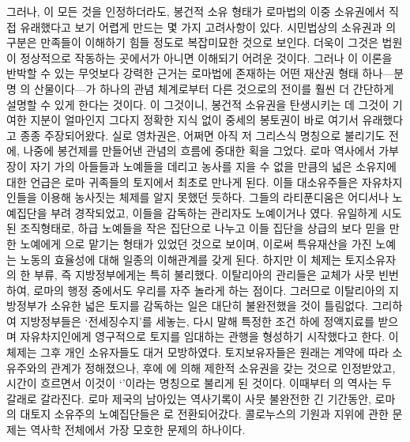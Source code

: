그러나,
이 모든 것을 인정하더라도,
봉건적 소유 형태가 로마법의 이중 소유권에서 직접
유래했다고 보기 어렵게 만드는 몇 가지 고려사항이 있다.
시민법상의 소유권과 의 구분은
만족들이 이해하기 힘들 정도로 복잡미묘한 것으로 보인다.
더욱이 그것은 법원이 정상적으로 작동하는 곳에서가 아니면 이해되기 어려운 것이다.
그러나 이 이론을 반박할 수 있는 무엇보다 강력한 근거는
로마법에 존재하는 어떤 재산권 형태 하나---분명 의 산물이다---가
하나의 관념 체계로부터 다른 것으로의 전이를 훨씬 더
간단하게 설명할 수 있게 한다는 것이다.
이 그것이니,
봉건적 소유권을 탄생시키는 데
그것이 기여한 지분이 얼마인지 그다지 정확한 지식 없이
중세의 봉토권이 바로 여기서 유래했다고
종종
주장되어왔다.
실로
영차권은,
어쩌면 아직 저 그리스식 명칭으로 불리기도 전에,
나중에 봉건제를 만들어낸 관념의 흐름에 중대한 획을 그었다.
로마 역사에서
가부장이 자기 가의 아들들과 노예들을 데리고
농사를 지을 수 없을 만큼의 넓은 소유지에 대한 언급은
로마 귀족들의 토지에서 최초로 만나게 된다.
이들 대소유주들은
자유차지인들을 이용해 농사짓는 체제를 알지 못했던 듯하다.
그들의 라티푼디움은 어디서나
노예집단을 부려 경작되었고,
이들을 감독하는 관리자도 노예이거나 였다.
유일하게 시도된 조직형태로,
하급 노예들을 작은 집단으로 나누고
이들 집단을 상급의 보다 믿을 만한 노예에게
으로 맡기는
형태가 있었던 것으로 보이며,
이로써 특유재산을 가진 노예는 노동의 효율성에 대해
일종의 이해관계를 갖게 된다.
하지만 이 체제는 토지소유자의 한 부류, 즉
지방정부에게는
특히 불리했다.
이탈리아의 관리들은 교체가 사뭇 빈번하여,
로마의 행정 중에서도 우리를 자주 놀라게 하는 점이다.
그러므로 이탈리아의 지방정부가 소유한 넓은 토지를
감독하는 일은 대단히 불완전했을 것이 틀림없다.
그리하여 지방정부들은
%
`전세징수지'를 세놓는,
다시 말해 특정한 조건 하에
정액지료를 받으며
자유차지인에게
영구적으로
토지를
임대하는
관행을 형성하기 시작했다고 한다.
이 체제는 그후 개인 소유자들도 대거 모방하였다.
토지보유자들은
원래는 계약에 따라
소유주와의 관계가
정해졌으나, 후에
에 의해 제한적 소유권을 갖는 것으로 인정받았고,
시간이 흐르면서 이것이 `'이라는 명칭으로 불리게 된 것이다.
이때부터
의 역사는 두 갈래로 갈라진다.
로마 제국의 남아있는 역사기록이 사뭇 불완전한 긴 기간동안,
로마의 대토지 소유주의 노예집단들은
로 전환되어갔다.
콜로누스의 기원과 지위에 관한 문제는
역사학 전체에서 가장 모호한 문제의 하나이다.
